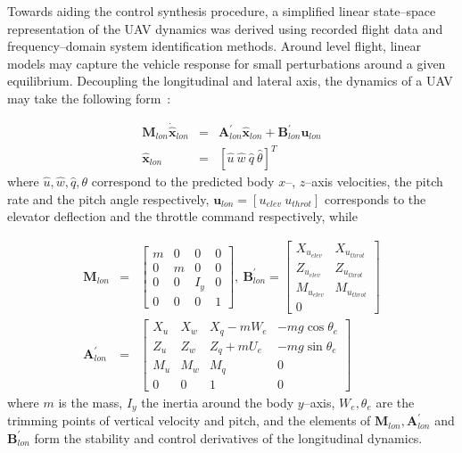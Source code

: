 
Towards aiding the control synthesis procedure, a simplified linear state--space representation of the UAV dynamics was derived using recorded flight data and frequency--domain system identification methods. Around level flight, linear models may capture the vehicle response for small perturbations around a given equilibrium. Decoupling the longitudinal and lateral axis, the dynamics of a UAV may take the following form~\cite{dorobantu2011frequency,OMLAS_MED_14}: 

\small
\begin{eqnarray}\label{LON_DYN}
 \mathbf{M}_{lon}\dot{\mathbf{\hat{x}}}_{lon} &=& \mathbf{A}^\prime_{lon}\mathbf{\hat{x}}_{lon}+\mathbf{B}^\prime_{lon}\mathbf{u}_{lon} \\ \nonumber
 \mathbf{\hat{x}}_{lon} &=& \left[ \hat{u}~\hat{w}~\hat{q}~\hat{\theta} \right]^T
\end{eqnarray}
\normalsize
where $\hat{u},\hat{w},\hat{q},\theta$ correspond to the predicted body $x$--, $z$--axis velocities, the pitch rate and the pitch angle respectively, $\mathbf{u}_{lon} = [u_{elev}~u_{throt}]$ corresponds to the elevator deflection and the throttle command respectively, while

\footnotesize
\begin{eqnarray}
\mathbf{M}_{lon} &=& \begin{bmatrix}

m & 0 & 0 & 0\\ 
0 & m & 0 & 0\\ 
0 & 0 & I_y & 0\\ 
0 & 0 & 0 & 1
\end{bmatrix},~
\mathbf{B}^\prime_{lon} = \begin{bmatrix}
X_{u_{elev}} & X_{u_{throt}}\\ 
Z_{u_{elev}} & Z_{u_{throt}}\\ 
M_{u_{elev}} & M_{u_{throt}}\\ 
0
\end{bmatrix} \\ \nonumber
\mathbf{A}^\prime_{lon} &=& \begin{bmatrix}
X_u & X_w & X_q-mW_e & -mg\cos\theta_e\\ 
Z_u & Z_w & Z_q+mU_e & -mg\sin\theta_e\\ 
M_u & M_w & M_q & 0 \\ 
0 & 0 & 1 & 0
\end{bmatrix}
\end{eqnarray}
\normalsize
where $m$ is the mass, $I_y$ the inertia around the body $y$--axis, $W_e,\theta_e$ are the trimming points of vertical velocity and pitch, and the elements of $\mathbf{M}_{lon},\mathbf{A}^\prime_{lon}$ and $\mathbf{B}^\prime_{lon}$ form the stability and control derivatives of the longitudinal dynamics. 

